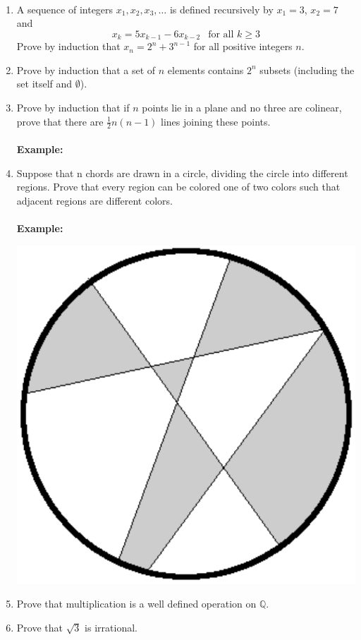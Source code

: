 \documentclass[12pt,letterpaper]{article}
\theoremstyle{plain}
\theoremstyle{definition}
\begin{document}
\ \\
\begin{enumerate}[1.]
\item A sequence of integers $x_1, x_2, x_3,\ldots $ is defined recursively by $x_1=3$, $x_2=7$ and
\[x_k=5x_{k-1}-6x_{k-2}\ \ \text{ for all }k\geq 3\]
Prove by induction that $x_n=2^n+3^{n-1}$ for all positive integers $n$. 
\ \\
\item Prove by induction that a set of $n$ elements contains $2^n$ subsets (including the set itself and $\emptyset$).
\ \\
\item Prove by induction that if $n$ points lie in a plane and no three are colinear, prove that there are $\frac{1}{2}n(n-1)$ lines joining these points. \\
\ \\
{\bf Example: }
\begin{center}
\end{center}

\item Suppose that n chords are drawn in a circle, dividing the circle into different regions.
Prove that every region can be colored one of two colors such that adjacent regions are
different colors. \\
\ \\
{\bf Example: }
\begin{center}
\includegraphics[scale=0.25]{circle}
\end{center}


\item  Prove that multiplication is a well defined operation on $\mathbb{Q}$.
\ \\
\item Prove that $\sqrt{3}$ is irrational. 

\end{enumerate}
\end{document}
